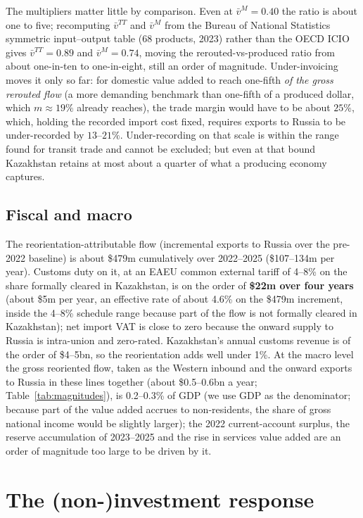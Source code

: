 \documentclass[12pt]{article}
\begin{document}
The multipliers matter little by comparison. Even at $\bar v^{M} = 0.40$ the ratio is about one
to five; recomputing $\bar v^{TT}$ and $\bar v^{M}$ from the Bureau of National Statistics
symmetric input--output table (68 products, 2023) rather than the OECD ICIO gives
$\bar v^{TT} = 0.89$ and $\bar v^{M} = 0.74$, moving the rerouted-vs-produced ratio from about
one-in-ten to one-in-eight, still an order of magnitude. Under-invoicing moves it only so far:
for domestic value added to reach one-fifth \emph{of the gross rerouted flow} (a more
demanding benchmark than one-fifth of a produced dollar, which $m \approx 19\%$ already
reaches), the trade margin would have to be about $25\%$, which, holding the recorded import cost fixed,
requires exports to Russia to be under-recorded by $13$--$21\%$. Under-recording on that scale is within the range found for
transit trade \citep{fisman2004missing} and cannot be excluded; but even at that bound
Kazakhstan retains at most about a quarter of what a producing economy captures.

\subsection{Fiscal and macro}

The reorientation-attributable flow (incremental exports to Russia over the pre-2022
baseline) is about \$479m cumulatively over 2022--2025 (\$107--134m per year). Customs duty on
it, at an EAEU common external tariff of 4--8\% on the share formally cleared in Kazakhstan, is
on the order of \textbf{\$22m over four years} (about \$5m per year, an effective rate of about 4.6\% on the \$479m increment, inside the 4--8\% schedule range because part of the flow is not formally cleared in Kazakhstan); net import VAT is close
to zero because the onward supply to Russia is intra-union and zero-rated. Kazakhstan's annual
customs revenue is of the order of \$4--5bn, so the reorientation adds well under 1\%. At the
macro level the gross reoriented flow, taken as the Western inbound and the onward exports to Russia in these lines together (about \$0.5--0.6bn a year; Table~\ref{tab:magnitudes}), is 0.2--0.3\% of GDP (we use GDP as the denominator; because part of the value added accrues to non-residents, the share of gross national income would be slightly larger); the 2022 current-account surplus, the reserve accumulation of
2023--2025 and the rise in services value added are an order of magnitude too large to be
driven by it.

\section{The (non-)investment response}\label{sec:investment}
\end{document}
